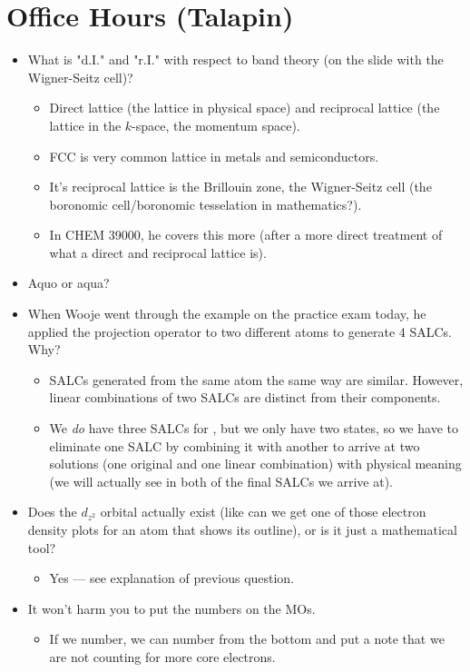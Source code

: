 \documentclass[../notes.tex]{subfiles}
\begin{document}
\section{Office Hours (Talapin)}
\begin{itemize}
    \item What is "d.I." and "r.I." with respect to band theory (on the slide with the Wigner-Seitz cell)?
    \begin{itemize}
        \item Direct lattice (the lattice in physical space) and reciprocal lattice (the lattice in the $k$-space, the momentum space).
        \item FCC is very common lattice in metals and semiconductors.
        \item It's reciprocal lattice is the Brillouin zone, the Wigner-Seitz cell (the boronomic cell/boronomic tesselation in mathematics?).
        \item In CHEM 39000, he covers this more (after a more direct treatment of what a direct and reciprocal lattice is).
    \end{itemize}
    \item Aquo or aqua?
    \item When Wooje went through the  example on the practice exam today, he applied the projection operator to two different atoms to generate 4 SALCs. Why?
    \begin{itemize}
        \item SALCs generated from the same atom the same way are similar. However, linear combinations of two SALCs are distinct from their components.
        \item We \emph{do} have three SALCs for , but we only have two states, so we have to eliminate one SALC by combining it with another to arrive at two solutions (one original and one linear combination) with physical meaning (we will actually see in  both of the final SALCs we arrive at).
    \end{itemize}
    \item Does the $d_{z^2}$ orbital actually exist (like can we get one of those electron density plots for an atom that shows its outline), or is it just a mathematical tool?
    \begin{itemize}
        \item Yes --- see explanation of previous question.
    \end{itemize}
    \item It won't harm you to put the numbers on the MOs.
    \begin{itemize}
        \item If we number, we can number from the bottom and put a note that we are not counting for more core electrons.
    \end{itemize}
\end{itemize}
\end{document}
